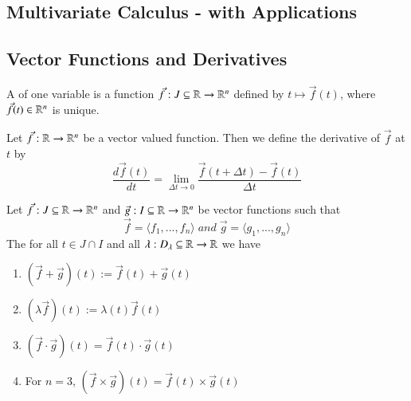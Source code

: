 \documentclass[12pt, a4paper, oneside, openright, titlepage]{book}
\begin{document}
\begin{appendices}
    \section{Multivariate Calculus - with Applications}
    
    \subsection{Vector Functions and Derivatives}
    
    \begin{defn}
        A  of one variable is a function $\vec{f}:J\subseteq \mathbb R\rightarrow \mathbb R^n$ defined by $t \mapsto \vec{f}(t)$, where $\vec{f}(t) \in \mathbb R^n$ is unique. 
    \end{defn}
    
    \begin{defn}
        Let $\vec{f}:\mathbb R\rightarrow \mathbb R^n$ be a vector valued function. Then we define the derivative of $\vec{f}$ at $t$ by \begin{equation}
            \frac{d\vec{f}(t)}{dt} = \lim\limits_{\Delta t\rightarrow 0} \frac{\vec{f}(t+\Delta t) - \vec{f}(t)}{\Delta t}
        \end{equation}
    \end{defn}
    
    \begin{rmk}[Properties]
        Let $\vec{f}:J\subseteq \mathbb R\rightarrow \mathbb R^n$ and $\vec{g}:I\subseteq \mathbb R\rightarrow \mathbb R^n$ be vector functions such that \begin{equation}
            \vec{f} = \langle f_1,...,f_n\rangle \; and\;\vec{g} = \langle g_1,...,g_n\rangle 
        \end{equation}
        The for all $t \in J \cap I$ and all $\lambda: D_{\lambda}\subseteq \mathbb R\rightarrow \mathbb R$ we have \begin{enumerate}
            \item $(\vec{f}+\vec{g})(t) := \vec{f}(t) + \vec{g}(t)$
            \item $(\lambda\vec{f})(t) := \lambda(t)\vec{f}(t)$
            \item $(\vec{f}\cdot\vec{g})(t) = \vec{f}(t)\cdot \vec{g}(t)$
            \item For $n = 3$, $(\vec{f} \times \vec{g})(t) = \vec{f}(t) \times \vec{g}(t)$
        \end{enumerate}
    \end{rmk}
        

\end{appendices}
\end{document}
